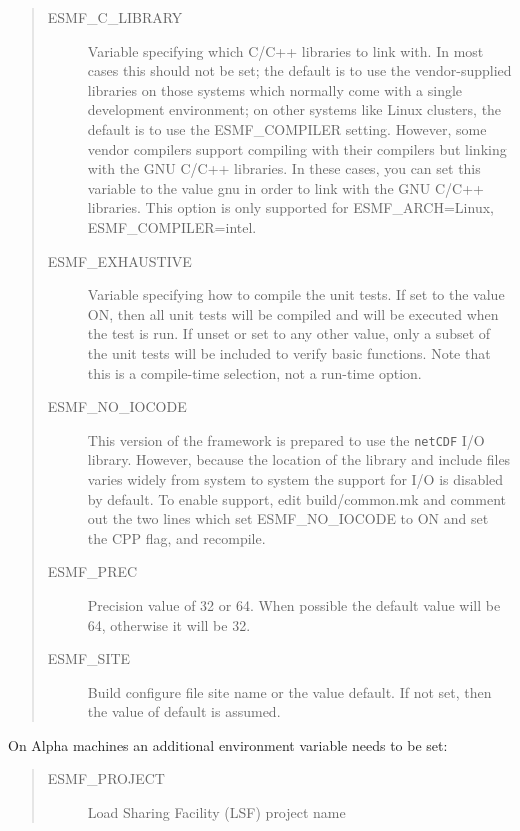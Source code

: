 \begin{quote}
\begin{description}
\item[ESMF\_C\_LIBRARY]

Variable specifying which C/C++ libraries to link with.  In most cases
this should not be set; the default is to use the vendor-supplied
libraries on those systems which normally come with a single
development environment; on other systems like Linux clusters,
the default is to use the ESMF\_COMPILER setting.  However, some
vendor compilers support compiling with their compilers but linking
with the GNU C/C++ libraries.
In these cases, you can set this variable
to the value gnu in order to link with the GNU C/C++ libraries.
This option is only supported for ESMF\_ARCH=Linux, ESMF\_COMPILER=intel.


  \item[ESMF\_EXHAUSTIVE] Variable specifying how to compile the unit tests.
                 If set to the value ON, then all unit tests will be compiled
                 and will be executed when the test is run.  If unset or set 
                 to any other value, only a subset of the unit tests will 
                 be included to verify basic functions.  Note that this
                 is a compile-time selection, not a run-time option.

  \item[ESMF\_NO\_IOCODE] This version of the framework is prepared to use
                 the {\tt netCDF} I/O library.  However, because the location
                 of the library and include files varies widely from 
                 system to system the support for I/O is disabled by default.
                 To enable support, edit build/common.mk and comment out the 
                 two lines which set ESMF\_NO\_IOCODE to ON and set the 
                 CPP flag,
                 and recompile.

  \item[ESMF\_PREC] Precision value of 32 or 64.  When possible the
                 default value will be 64, otherwise it will be 32.

  \item[ESMF\_SITE] Build configure file site name or the value default.  
                 If not set, then the value of default is assumed.


\end{description}
\end{quote}

On Alpha machines an additional environment variable needs
to be set:

\begin{quote}
\begin{description}
  \item[ESMF\_PROJECT] Load Sharing Facility (LSF) project name
\end{description}
\end{quote}

